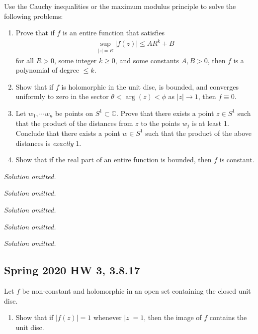 \begin{problem}[?]

Use the Cauchy inequalities or the maximum modulus principle to solve
the following problems:

\begin{enumerate}
\def\labelenumi{\alph{enumi}.}
\item
  Prove that if \(f\) is an entire function that satisfies
  \begin{align*}
  \sup _{|z|=R}|f(z)| \leq A R^{k}+B
  \end{align*}
  for all \(R>0\), some integer \(k\geq 0\), and some constants
  \(A, B > 0\), then \(f\) is a polynomial of degree \(\leq k\).
\item
  Show that if \(f\) is holomorphic in the unit disc, is bounded, and
  converges uniformly to zero in the sector \(\theta < \arg(z) < \phi\)
  as \({\left\lvert {z} \right\rvert} \to 1\), then \(f \equiv 0\).
\item
  Let \(w_1, \cdots w_n\) be points on \(S^1 \subset {\mathbb{C}}\).
  Prove that there exists a point \(z\in S^1\) such that the product of
  the distances from \(z\) to the points \(w_j\) is at least 1. Conclude
  that there exists a point \(w\in S^1\) such that the product of the
  above distances is \emph{exactly} 1.
\item
  Show that if the real part of an entire function is bounded, then
  \(f\) is constant.
\end{enumerate}

\end{problem}

\emph{Solution omitted.}

\emph{Solution omitted.}

\emph{Solution omitted.}

\emph{Solution omitted.}

\emph{Solution omitted.}

\hypertarget{spring-2020-hw-3-3.8.17}{%
\subsection{Spring 2020 HW 3, 3.8.17}\label{spring-2020-hw-3-3.8.17}}

Let \(f\) be non-constant and holomorphic in an open set containing the
closed unit disc.

\begin{enumerate}
\def\labelenumi{\alph{enumi}.}
\tightlist
\item
  Show that if \({\left\lvert {f(z)} \right\rvert} = 1\) whenever
  \({\left\lvert {z} \right\rvert} = 1\), then the image of \(f\)
  contains the unit disc.
\end{enumerate}

